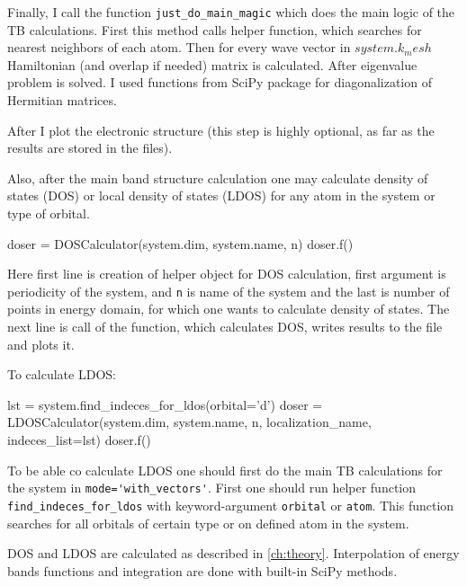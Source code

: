 Finally, I call the function \verb!just_do_main_magic! which does the main logic of the TB calculations. First this method calls helper function, which searches for nearest neighbors of each atom. Then for every wave vector in $system.k_mesh$ Hamiltonian (and overlap if needed) matrix is calculated. After eigenvalue problem is solved. I used functions from SciPy package for diagonalization of Hermitian matrices.

After I plot the electronic structure (this step is highly optional, as far as the results are stored in the files).

Also, after the main band structure calculation one may calculate density of states (DOS) or local density of states (LDOS) for any atom in the system or type of orbital.
\begin{python}
doser = DOSCalculator(system.dim, system.name, n)
doser.f()
\end{python}
Here first line is creation of helper object for DOS calculation, first argument is periodicity of the system, and \verb!n! is name of the system and the last is number of points in energy domain, for which one wants to calculate density of states. The next line is call of the function, which calculates DOS, writes results to the file and plots it.


To calculate LDOS:
\begin{python}
lst = system.find_indeces_for_ldos(orbital='d')
doser = LDOSCalculator(system.dim, system.name, n, localization_name, indeces_list=lst)
doser.f()
\end{python}

To be able co calculate LDOS one should first do the main TB calculations for the system in \verb!mode='with_vectors'!. First one should run helper function \verb!find_indeces_for_ldos! with keyword-argument \verb!orbital! or \verb!atom!. This function searches for all orbitals of certain type or on defined atom in the system. 

DOS and LDOS are calculated as described in \ref{ch:theory}. Interpolation of energy bands functions and integration are done with built-in SciPy methods.